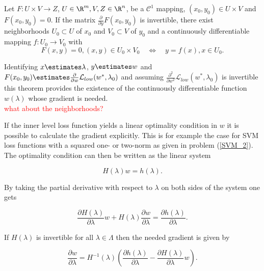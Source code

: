 \begin{theorem}
	Let \(F: U \times V \to Z \), \(U\in\R^m, V,Z\in \R^n \), be a \(\mathcal{C}^1\) mapping, \((x_0,y_0) \in U\times V\)  and \(F(x_0,y_0) = 0\). If the matrix \(\frac{\partial}{\partial y}F(x_0,y_0)\) is invertible, there exist neighborhoods \(U_0\subset U\) of \(x_0\) and \(V_0\subset V\) of \(y_0\) and a continuously differentiable mapping \(f:U_0 \to V_0\) with 
	\begin{equation*}
	F(x,y) = 0, (x,y)\in U_0\times V_0  \quad \Leftrightarrow \quad y = f(x), x\in U_0.
	\end{equation*}
\end{theorem}

Identifying \(x \estimates \lambda\), \(y \estimates w\) and  \(F(x_0,y_0) \estimates \frac{\partial}{\partial w} \mathcal{L}_{low}(w^*,\lambda_0)\) and assuming \(\frac{\partial^2 }{\partial  w^2}\mathcal{L}_{low}(w^*,\lambda_0)\) is invertible this theorem provides the existence of the continuously differentiable function \(w(\lambda)\) whose gradient is needed. \\
\textcolor{red}{what about the neighborhoods?}

If the inner level loss function yields a linear optimality condition in \(w\) it is possible to calculate the gradient explicitly. This is for example the case for SVM loss functions with a squared one- or two-norm as given in problem (\ref{SVM_2}).
The optimality condition can then be written as the linear system

\begin{equation*}
	H(\lambda)w = h(\lambda).
\end{equation*}

By taking the partial derivative with respect to \(\lambda\) on both sides of the system one gets

\begin{equation*}
	\frac{\partial H(\lambda)}{\partial \lambda}w+H(\lambda)\frac{\partial w}{\partial \lambda} = \frac{\partial h(\lambda)}{\partial  \lambda}.
\end{equation*}

If \(H(\lambda)\) is invertible for all \(\lambda \in \Lambda\) then the needed gradient is given by 

\begin{equation*}
	\frac{\partial w}{\partial \lambda} = H^{-1}(\lambda)\left(\frac{\partial h(\lambda)}{\partial \lambda}-\frac{\partial H(\lambda)}{\partial \lambda}w\right).
\end{equation*}

